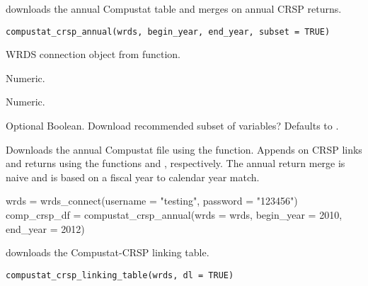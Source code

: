 \documentclass[a4paper]{book}
\begin{document}
%
\begin{Description}\relax
{} downloads the annual Compustat table and merges on annual CRSP returns.
\end{Description}
%
\begin{Usage}
\begin{verbatim}
compustat_crsp_annual(wrds, begin_year, end_year, subset = TRUE)
\end{verbatim}
\end{Usage}
%
\begin{Arguments}
\begin{ldescription}
\item[\code{wrds}] WRDS connection object from  function.

\item[\code{begin\_year}] Numeric.

\item[\code{end\_year}] Numeric.

\item[\code{subset}] Optional Boolean. Download recommended subset of variables? Defaults to .
\end{ldescription}
\end{Arguments}
%
\begin{Details}\relax
Downloads the annual Compustat file using the  function. Appends on
CRSP links and returns using the functions  and
, respectively. The annual return merge is naive and is based on a fiscal year
to calendar year match.
\end{Details}
%
\begin{Examples}
\begin{ExampleCode}
wrds = wrds_connect(username = "testing", password = "123456")
comp_crsp_df = compustat_crsp_annual(wrds = wrds, begin_year = 2010, end_year = 2012)
\end{ExampleCode}
\end{Examples}
%
\begin{Description}\relax
{} downloads the Compustat-CRSP linking table.
\end{Description}
%
\begin{Usage}
\begin{verbatim}
compustat_crsp_linking_table(wrds, dl = TRUE)
\end{verbatim}
\end{Usage}
\end{document}
